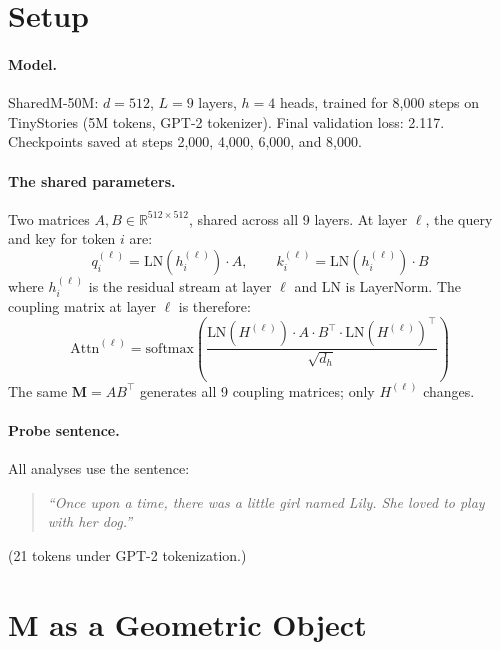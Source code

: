 \documentclass[11pt, a4paper]{article}
\newcommand{\M}{\mathbf{M}}
\newcommand{\R}{\mathbb{R}}
\theoremstyle{plain}
\theoremstyle{remark}
\begin{document}
\section{Setup}

\paragraph{Model.} SharedM-50M: $d = 512$, $L = 9$ layers, $h = 4$ heads, trained for 8{,}000 steps on TinyStories (5M tokens, GPT-2 tokenizer).
Final validation loss: 2.117.
Checkpoints saved at steps 2{,}000, 4{,}000, 6{,}000, and 8{,}000.

\paragraph{The shared parameters.} Two matrices $A, B \in \R^{512 \times 512}$, shared across all 9 layers.
At layer $\ell$, the query and key for token $i$ are:
\begin{equation}
    q_i^{(\ell)} = \text{LN}(h_i^{(\ell)}) \cdot A, \qquad k_i^{(\ell)} = \text{LN}(h_i^{(\ell)}) \cdot B
\end{equation}
where $h_i^{(\ell)}$ is the residual stream at layer $\ell$ and $\text{LN}$ is LayerNorm.
The coupling matrix at layer $\ell$ is therefore:
\begin{equation}
    \text{Attn}^{(\ell)} = \text{softmax}\!\left(\frac{\text{LN}(H^{(\ell)}) \cdot A \cdot B^\top \cdot \text{LN}(H^{(\ell)})^\top}{\sqrt{d_h}}\right)
\end{equation}
The same $\M = AB^\top$ generates all 9 coupling matrices; only $H^{(\ell)}$ changes.

\paragraph{Probe sentence.} All analyses use the sentence:
\begin{quote}\itshape
``Once upon a time, there was a little girl named Lily. She loved to play with her dog.''
\end{quote}
(21 tokens under GPT-2 tokenization.)

\section{M as a Geometric Object}
\end{document}

